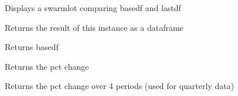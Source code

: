 \documentclass[letterpaper,10pt,english]{sphinxmanual}
\begin{document}
\begin{fulllineitems}

\begin{fulllineitems}
\label{\detokenize{vis/modelvis:modelvis.vis.swarm}}
\pysigstartsignatures
{}
\pysigstopsignatures
\sphinxAtStartPar
Displays a swarmlot comparing basedf and lastdf

\end{fulllineitems}


\begin{fulllineitems}
\label{\detokenize{vis/modelvis:modelvis.vis.df}}
\pysigstartsignatures
{}
\pysigstopsignatures
\sphinxAtStartPar
Returns the result of this instance as a dataframe

\end{fulllineitems}


\begin{fulllineitems}
\label{\detokenize{vis/modelvis:modelvis.vis.base}}
\pysigstartsignatures
{}
\pysigstopsignatures
\sphinxAtStartPar
Returns basedf

\end{fulllineitems}


\begin{fulllineitems}
\label{\detokenize{vis/modelvis:modelvis.vis.pct}}
\pysigstartsignatures
{}
\pysigstopsignatures
\sphinxAtStartPar
Returns the pct change

\end{fulllineitems}


\begin{fulllineitems}
\label{\detokenize{vis/modelvis:modelvis.vis.year_pct}}
\pysigstartsignatures
{}
\pysigstopsignatures
\sphinxAtStartPar
Returns the pct change over 4 periods (used for quarterly data)


\end{fulllineitems}
\end{fulllineitems}
\end{document}
